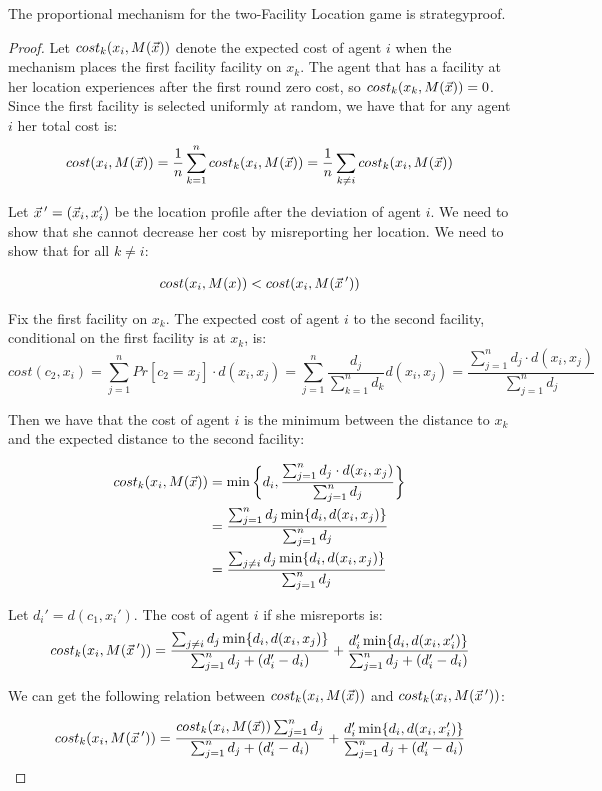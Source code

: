 \begin{theorem}
The proportional mechanism for the two-Facility Location game is strategyproof.
\end{theorem}
\begin{proof}
Let $cost_k(x_i,M(\vec{x}))$ denote the expected cost of agent $i$ when the mechanism places the first facility facility on $x_k$. The agent that has a facility at her location experiences after the first round zero cost, so $cost_k(x_k,M(\vec{x}))=0$. Since the first facility is selected uniformly at random, we have that for any agent $i$ her total cost is:
\[ cost(x_i,M(\vec{x})) = \frac{1}{n}\sum_{k=1}^{n} cost_k(x_i,M(\vec{x})) = \frac{1}{n}\sum_{k\ne i} cost_k(x_i,M(\vec{x})) \]



Let $\vec{x}\,'=(\vec{x}_{i},x_i')$ be the location profile after the deviation of agent $i$. We need to show that she cannot decrease her cost by misreporting her location. We need to show that for all $k\ne i$:

\[ cost(x_i,M(x)) < cost(x_i, M(\vec{x}\,'))\]

Fix the first facility on $x_k$. The expected cost of agent $i$ to the second facility, conditional on the first facility is at $x_k$, is:
\[ cost(c_2,x_i) = \sum_{j=1}^{n} { Pr[c_2=x_j]\cdot d(x_i,x_j)} = \sum_{j=1}^{n} { \frac{d_j}{\sum_{k=1 }^{n}d_k} d(x_i,x_j)}  = \frac{ \sum_{j=1}^{n}d_j \cdot d(x_i,x_j)}{\sum_{j=1}^{n}d_j} \]

Then we have that the cost of agent $i$ is the minimum between the distance to $x_k$ and the expected distance to the second facility:

\begin{align*}
   cost_k(x_i,M(\vec{x})) &= \min\bigg\{d_i, \frac{ \sum_{j=1}^{n}d_j \cdot d(x_i,x_j)}{\sum_{j=1}^{n}d_j}  \bigg\}\\
   &= \frac{\sum_{j=1}^{n}d_j \min\{d_i,d(x_i,x_j)\}}{\sum_{j=1 }^{n}d_j}\\
   &= \frac{\sum_{j\neq i}d_j \min\{d_i,d(x_i,x_j)\}}{\sum_{j=1 }^{n}d_j}
\end{align*}

Let $d_i'=d(c_1,x_i')$. The cost of agent $i$ if she misreports is:
\[ cost_k(x_i,M(\vec{x}\,')) =\frac{\sum_{j\neq i}d_j \min\{d_i,d(x_i,x_j)\}}{\sum_{j=1 }^{n}d_j + (d_i'-d_i)} + \frac{d_i' \min\{d_i,d(x_i,x_i')\}}{\sum_{j=1 }^{n}d_j + (d_i'-d_i)} \]

We can get the following relation between $cost_k(x_i,M(\vec{x}))$ and $cost_k(x_i,M(\vec{x}\,'))$:

\begin{equation}\label{compCost}
cost_k(x_i,M(\vec{x}\,')) =\frac{ cost_k(x_i,M(\vec{x})) \sum_{j=1}^{n}d_j }{\sum_{j=1 }^{n}d_j + (d_i'-d_i)} + \frac{d_i' \min\{d_i,d(x_i,x_i')\}}{\sum_{j=1 }^{n}d_j + (d_i'-d_i)}    
\end{equation}



\end{proof}
